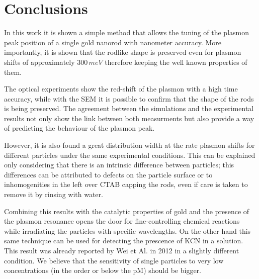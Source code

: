 \documentclass[twocolumn]{article}
\begin{document}
\section{Conclusions}
In this work it is shown a simple method that allows the tuning of the plasmon
peak position of a single gold nanorod with nanometer accuracy. More
importantly, it is shown that the rodlike shape is preserved even for plasmon
shifts of approximately $300\,meV$ therefore keeping the well known properties
of them.

The optical experiments show the red-shift of the plasmon with a high time
accuracy, while with the SEM it is possible to confirm that the shape of the
rods is being preserved. The agreement between the simulations and the
experimental results not only show the link between both measurments but also
provide a way of predicting the behaviour of the plasmon peak. 

However, it is also found a great distribution width at the rate plasmon shifts
for different particles under the same experimental conditions. This can be
explained only considering that there is an intrinsic difference between
particles; this differences can be attributed to defects on the particle surface
or to inhomogenities in the left over CTAB capping the rods, even if care is
taken to remove it by rinsing with water.

Combining this results with the catalytic properties of gold and the presence of
the plasmon resonance opens the door for fine-controlling chemical reactions
while irradiating the particles with specific wavelengths. On the other hand
this same technique can be used for detecting the prescence of KCN in a
solution. This result was already reported by Wei et Al. in 2012 \cite{Wei2012}
in a slightly different condition. We believe that the sensitivity of single
particles to very low concentrations (in the order or below the pM) should be
bigger.

{}

\end{document}
